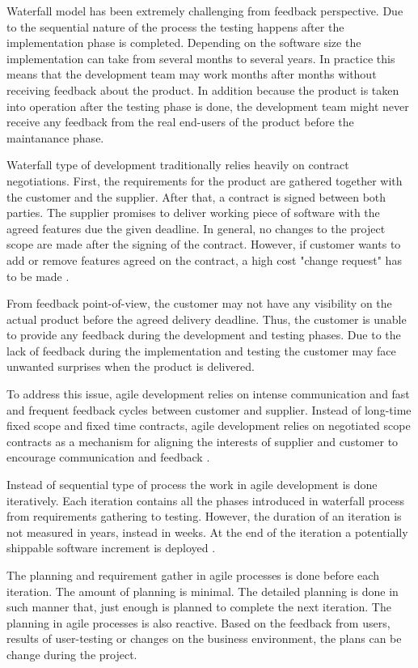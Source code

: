 \documentclass[english,12pt,a4paper,pdftex]{article}
\begin{document}
Waterfall model has been extremely challenging from feedback perspective. Due to the sequential nature of the process the testing happens after the implementation phase is completed. Depending on the software size the implementation can take from several months to several years. In practice this means that the development team may work months after months without receiving feedback about the product. In addition because the product is taken into operation after the testing phase is done, the development team might never receive any feedback from the real end-users of the product before the maintanance phase.

Waterfall type of development traditionally relies heavily on contract negotiations. First, the requirements for the product are gathered together with the customer and the supplier. After that, a contract is signed between both parties. The supplier promises to deliver working piece of software with the agreed features due the given deadline. In general, no changes to the project scope are made after the signing of the contract. However, if customer wants to add or remove features agreed on the contract, a high cost "change request" has to be made \citep{beck2004}. 

From feedback point-of-view, the customer may not have any visibility on the actual product before the agreed delivery deadline. Thus, the customer is unable to provide any feedback during the development and testing phases. Due to the lack of feedback during the implementation and testing the customer may face unwanted surprises when the product is delivered.

To address this issue, agile development relies on intense communication and fast and frequent feedback cycles between customer and supplier. Instead of long-time fixed scope and fixed time contracts, agile development relies on negotiated scope contracts as a mechanism for aligning the interests of supplier and customer to encourage communication and feedback \citep{beck2004}.

Instead of sequential type of process the work in agile development is done iteratively. Each iteration contains all the phases introduced in waterfall process from requirements gathering to testing. However, the duration of an iteration is not measured in years, instead in weeks. At the end of the iteration a potentially shippable software increment is deployed \citep{shore2007}.

The planning and requirement gather in agile processes is done before each iteration. The amount of planning is minimal. The detailed planning is done in such manner that, just enough is planned to complete the next iteration. The planning in agile processes is also reactive. Based on the feedback from users, results of user-testing or changes on the business environment, the plans can be change during the project. 
\end{document}
